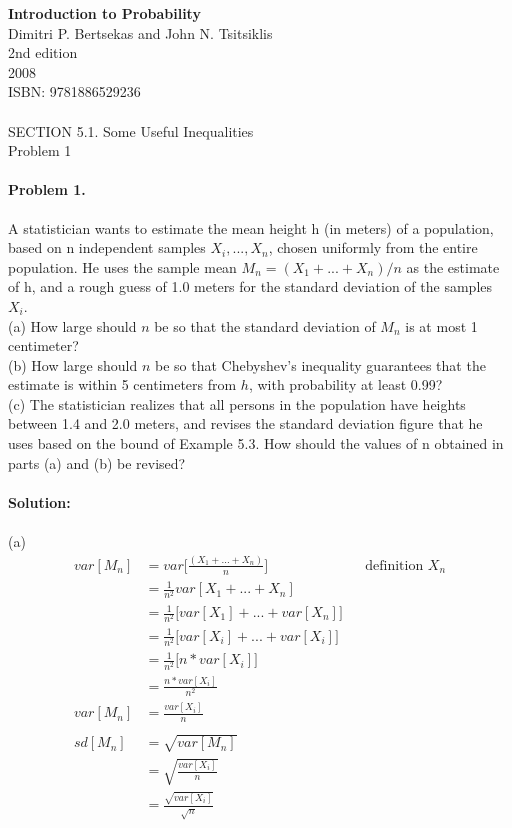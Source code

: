 \documentclass[10pt,a4paper]{article}
\author{Daniel Frederico Lins Leite}
\begin{document}
	
\textbf{Introduction to Probability}\\
Dimitri P. Bertsekas and John N. Tsitsiklis\\
2nd edition\\
2008\\
ISBN: 9781886529236\\
\\
SECTION 5.1. Some Useful Inequalities\\
Problem 1
\paragraph{Problem 1.}	
	 A statistician wants to estimate the mean height h (in meters) of a 
	population, based on n independent samples $X_i, ... , X_n$, chosen uniformly from the 
	entire population. He uses the sample mean $M_n = (X_1 + ... + X_n)/n$ as the estimate 
	of h, and a rough guess of 1.0 meters for the standard deviation of the samples $X_i$.
	\\
	(a) How large should $n$ be so that the standard deviation of $M_n$ is at most 1 centimeter? 	
	\\
	(b) How large should $n$ be so that Chebyshev's inequality guarantees that the estimate is within 5 centimeters from $h$, with probability at least 0.99? 
	\\
	(c) The statistician realizes that all persons in the population have heights between 
	1.4 and 2.0 meters, and revises the standard deviation figure that he uses based 
	on the bound of Example 5.3. How should the values of n obtained in parts (a) 
	and (b) be revised?\\
	\\
	\newpage
	\textbf{Solution:}\\
	\\
	(a)
	\begin{align*}
		var[M_n] &= var \bigg[\frac{(X_1 + ... + X_n)}{n} \bigg] && \text{definition $X_n$}\\
		&= \frac{1}{n^2} var [X_1 + ... + X_n ]\\
		&= \frac{1}{n^2} \bigg[ var [X_1] + ... + var [X_n] \bigg]\\
		&= \frac{1}{n^2} \bigg[ var [X_i] + ... + var [X_i] \bigg]\\
		&= \frac{1}{n^2} \bigg[ n*var [X_i] \bigg]\\		
		&= \frac{n*var [X_i]}{n^2}\\
		var[M_n] &= \frac{var [X_i]}{n}\\
		\\	
		sd[M_n] &= \sqrt{var[M_n]}\\
		&= \sqrt{ \frac{var [X_i]}{n} }\\
		&= \frac{\sqrt{var [X_i]}}{\sqrt{n}}\\
	\end{align*}
\end{document}
